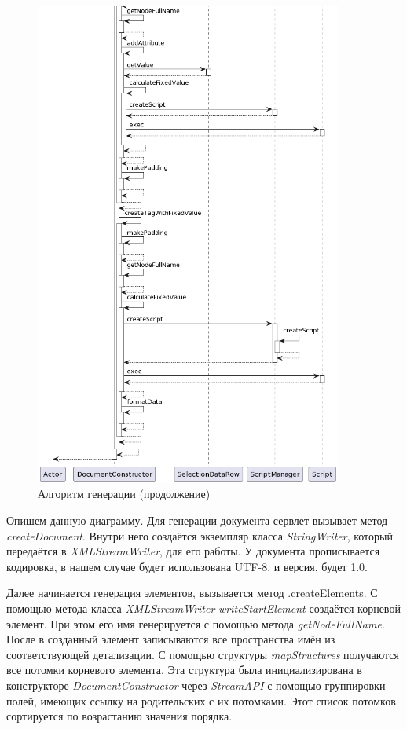 \documentclass[a4paper,12pt]{diplom}
\begin{document}
\begin{figure}[h!]
	\centering
	\includegraphics[width=0.9\textwidth]{imgs/crDoc2.png}
	\caption{Алгоритм генерации (продолжение)}
	\label{fig:algorithm2}
\end{figure}

Опишем данную диаграмму. Для генерации документа сервлет вызывает метод \textit{createDocument}. Внутри него создаётся экземпляр класса \textit{StringWriter}, который передаётся в \textit{XMLStreamWriter}, для его работы. У документа прописывается кодировка, в нашем случае будет использована UTF-8, и версия, будет 1.0.

Далее начинается генерация элементов, вызывается метод .createElements. С помощью метода класса \textit{XMLStreamWriter } \textit{writeStartElement} создаётся корневой элемент. При этом его имя генерируется с помощью метода \textit{getNodeFullName}. После в созданный элемент записываются все пространства имён из соответствующей детализации. С помощью структуры \textit{mapStructures} получаются все потомки корневого элемента. Эта структура была инициализирована в конструкторе \textit{DocumentConstructor} через \textit{StreamAPI} с помощью группировки полей, имеющих ссылку на родительских с их потомками. Этот список потомков сортируется по возрастанию значения порядка. 
\end{document}
